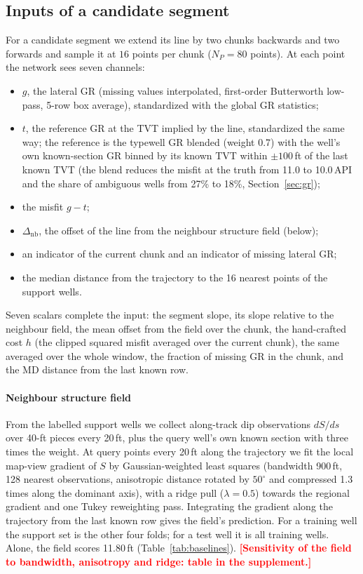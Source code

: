 \documentclass[preprint,12pt,authoryear]{elsarticle}
\newcommand{\PH}[1]{\textcolor{red}{\textbf{[#1]}}}
\newcommand{\Sv}{S}
\begin{document}
\subsection{Inputs of a candidate segment}\label{sec:inputs}
For a candidate segment we extend its line by two chunks backwards and two forwards and sample it at $16$ points per chunk ($N_P=80$ points). At each point the network sees seven channels:
\begin{itemize}
\item $g$, the lateral GR (missing values interpolated, first-order Butterworth low-pass, 5-row box average), standardized with the global GR statistics;
\item $t$, the reference GR at the TVT implied by the line, standardized the same way; the reference is the typewell GR blended (weight 0.7) with the well's own known-section GR binned by its known TVT within $\pm100$\,ft of the last known TVT (the blend reduces the misfit at the truth from 11.0 to 10.0\,API and the share of ambiguous wells from 27\% to 18\%, Section~\ref{sec:gr});
\item the misfit $g-t$;
\item $\Delta_{\mathrm{nb}}$, the offset of the line from the neighbour structure field (below);
\item an indicator of the current chunk and an indicator of missing lateral GR;
\item the median distance from the trajectory to the 16 nearest points of the support wells.
\end{itemize}
Seven scalars complete the input: the segment slope, its slope relative to the neighbour field, the mean offset from the field over the chunk, the hand-crafted cost $h$ (the clipped squared misfit averaged over the current chunk), the same averaged over the whole window, the fraction of missing GR in the chunk, and the MD distance from the last known row.

\paragraph{Neighbour structure field}
From the labelled support wells we collect along-track dip observations $d\Sv/ds$ over 40-ft pieces every 20\,ft, plus the query well's own known section with three times the weight. At query points every 20\,ft along the trajectory we fit the local map-view gradient of $\Sv$ by Gaussian-weighted least squares (bandwidth 900\,ft, 128 nearest observations, anisotropic distance rotated by $50^\circ$ and compressed 1.3 times along the dominant axis), with a ridge pull ($\lambda=0.5$) towards the regional gradient and one Tukey reweighting pass. Integrating the gradient along the trajectory from the last known row gives the field's prediction. For a training well the support set is the other four folds; for a test well it is all training wells. Alone, the field scores 11.80\,ft (Table~\ref{tab:baselines}). \PH{Sensitivity of the field to bandwidth, anisotropy and ridge: table in the supplement.}
\end{document}
